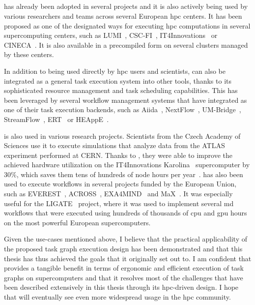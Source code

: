 \subsection*{\hyperqueue{}}
\hyperqueue{} has already been adopted in several projects and it is also actively
being used by various researchers and teams across several European \gls{hpc}
centers. It has been proposed as one of the designated ways for executing
\gls{hpc} computations in several supercomputing centers, such as
LUMI~\cite{it4i-lumi}, CSC-FI~\cite{puhti-hq,puhti-hq-2},
IT4Innovations~\cite{it4i-hq} or CINECA~\cite{cineca}. It is also
available in a precompiled form on several clusters managed by these centers.

In addition to being used directly by \gls{hpc} users and scientists,
\hyperqueue{} can also be integrated as a general task execution system into other
tools, thanks to its sophisticated resource management and task scheduling capabilities. This has
been leveraged by several workflow management systems that have integrated
\hyperqueue{} as one of their task execution backends, such as
Aiida~\cite{aiida-hq}, NextFlow~\cite{nextflow-hq},
UM-Bridge~\cite{umbridge}, StreamFlow~\cite{streamflow-hq},
ERT~\cite{ert} or HEAppE~\cite{heappe_hq}.

\hyperqueue{} is also used in various research projects. Scientists from the Czech
Academy of Sciences use it to execute simulations that analyze data from the
ATLAS~\cite{atlas} experiment performed at CERN. Thanks to
\hyperqueue{}, they were able to improve the achieved hardware utilization on the
IT4Innovations Karolina~\cite{karolina} supercomputer by 30\%, which saves them tens of
hundreds of node hours per year~\cite{cern-hq}. \hyperqueue{} has also
been used to execute workflows in several projects funded by the European Union, such as
EVEREST~\cite{everest}, ACROSS~\cite{across},
EXA4MIND~\cite{exa4mind} and MaX~\cite{max}. It was especially useful
for the LIGATE~\cite{ligate} project, where it was used to implement several
\gls{md} workflows that were executed using hundreds of thousands of
\gls{cpu} and \gls{gpu} hours on the most powerful European
supercomputers.

Given the use-cases mentioned above, I believe that the practical applicability of the proposed
task graph execution design has been demonstrated and that this thesis has thus achieved the goals
that it originally set out to. I am confident that \hyperqueue{} provides a tangible
benefit in terms of ergonomic and efficient execution of task graphs on supercomputers and that it
resolves most of the challenges that have been described extensively in this thesis through its
\gls{hpc}-driven design. I hope that \hyperqueue{} will eventually
see even more widespread usage in the \gls{hpc} community.
